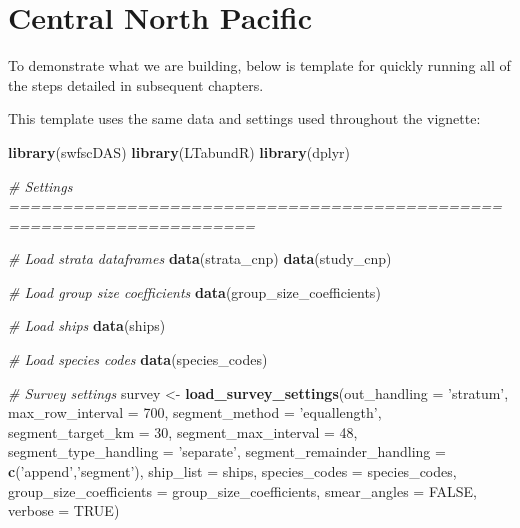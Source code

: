 \documentclass[
]{book}
\newenvironment{Shaded}{\begin{snugshade}}{\end{snugshade}}
\newcommand{\CommentTok}[1]{\textcolor[rgb]{0.56,0.35,0.01}{\textit{#1}}}
\newcommand{\DataTypeTok}[1]{\textcolor[rgb]{0.13,0.29,0.53}{#1}}
\newcommand{\DecValTok}[1]{\textcolor[rgb]{0.00,0.00,0.81}{#1}}
\newcommand{\KeywordTok}[1]{\textcolor[rgb]{0.13,0.29,0.53}{\textbf{#1}}}
\newcommand{\NormalTok}[1]{#1}
\newcommand{\OtherTok}[1]{\textcolor[rgb]{0.56,0.35,0.01}{#1}}
\newcommand{\StringTok}[1]{\textcolor[rgb]{0.31,0.60,0.02}{#1}}
\begin{document}
\hypertarget{casestudies}{%
\chapter{Central North Pacific}\label{casestudies}}

To demonstrate what we are building, below is template for quickly running all of the steps detailed in subsequent chapters.

This template uses the same data and settings used throughout the vignette:

\begin{Shaded}
\begin{Highlighting}[]
\KeywordTok{library}\NormalTok{(swfscDAS)}
\KeywordTok{library}\NormalTok{(LTabundR)}
\KeywordTok{library}\NormalTok{(dplyr)}

\CommentTok{# Settings =====================================================================}

\CommentTok{# Load strata dataframes}
\KeywordTok{data}\NormalTok{(strata_cnp)}
\KeywordTok{data}\NormalTok{(study_cnp)}

\CommentTok{# Load group size coefficients}
\KeywordTok{data}\NormalTok{(group_size_coefficients)}

\CommentTok{# Load ships}
\KeywordTok{data}\NormalTok{(ships)}

\CommentTok{# Load species codes}
\KeywordTok{data}\NormalTok{(species_codes)}

\CommentTok{# Survey settings}
\NormalTok{survey <-}\StringTok{ }
\StringTok{  }\KeywordTok{load_survey_settings}\NormalTok{(}\DataTypeTok{out_handling =} \StringTok{'stratum'}\NormalTok{,}
                       \DataTypeTok{max_row_interval =} \DecValTok{700}\NormalTok{,}
                       \DataTypeTok{segment_method =} \StringTok{'equallength'}\NormalTok{,}
                       \DataTypeTok{segment_target_km =} \DecValTok{30}\NormalTok{,}
                       \DataTypeTok{segment_max_interval =} \DecValTok{48}\NormalTok{,}
                       \DataTypeTok{segment_type_handling =} \StringTok{'separate'}\NormalTok{,}
                       \DataTypeTok{segment_remainder_handling =} \KeywordTok{c}\NormalTok{(}\StringTok{'append'}\NormalTok{,}\StringTok{'segment'}\NormalTok{),}
                       \DataTypeTok{ship_list =}\NormalTok{ ships,}
                       \DataTypeTok{species_codes =}\NormalTok{ species_codes,}
                       \DataTypeTok{group_size_coefficients =}\NormalTok{ group_size_coefficients,}
                       \DataTypeTok{smear_angles =} \OtherTok{FALSE}\NormalTok{,}
                       \DataTypeTok{verbose =} \OtherTok{TRUE}\NormalTok{)}


\end{Highlighting}
\end{Shaded}
\end{document}
